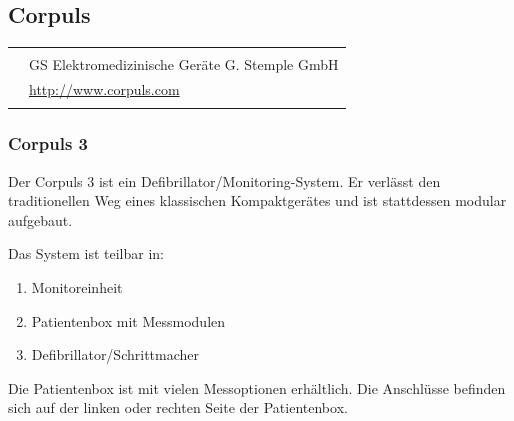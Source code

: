 \subsection{Corpuls\texttrademark}



\begin{table}[H]
\begin{tabulary}{\linewidth}{LL}
&
\\\addlinespace\midrule\addlinespace
{}
&
GS Elektromedizinische Geräte G. Stemple GmbH
\\\addlinespace
{}
&
\url{http://www.corpuls.com}
\\\addlinespace\bottomrule
\end{tabulary}
\end{table}

\subsubsection{Corpuls 3}

\TakeNotesLarge

Der Corpuls 3 ist ein Defibrillator/Monitoring-System. Er verlässt den
traditionellen Weg eines klassischen Kompaktgerätes und ist stattdessen modular aufgebaut.

Das System ist teilbar in:

\begin{enumerate}
    \item Monitoreinheit
    \item Patientenbox mit Messmodulen
    \item Defibrillator/Schrittmacher
\end{enumerate}


Die Patientenbox ist mit vielen Messoptionen erhältlich. Die Anschlüsse
befinden sich auf der linken oder rechten Seite der Patientenbox.

